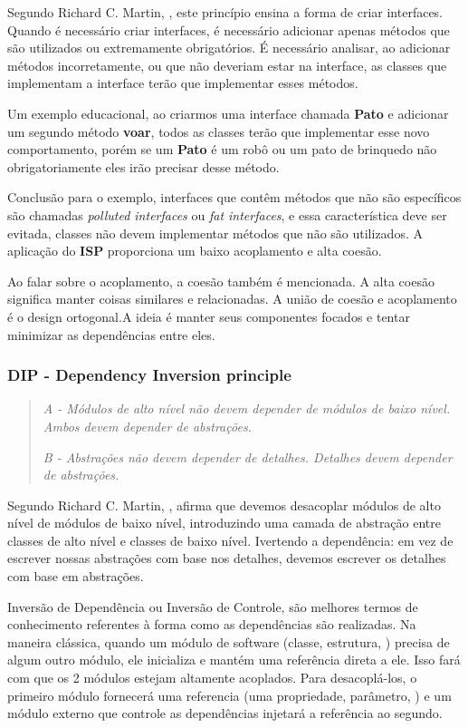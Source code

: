 \documentclass[12pt]{article}
\begin{document}
Segundo Richard C. Martin, \cite{ROBERT_MARTIN_THE_CLEAN_ARCHITECTURE}, este princípio ensina a forma de criar interfaces. Quando é necessário criar interfaces, é necessário adicionar apenas métodos que são utilizados ou extremamente obrigatórios. É necessário analisar, ao adicionar métodos incorretamente, ou que não deveriam estar na interface, as classes que implementam a interface terão que implementar esses métodos. 

Um exemplo educacional, ao criarmos uma interface chamada \textbf{Pato} e adicionar um segundo método \textbf{voar}, todos as classes terão que implementar esse novo comportamento, porém se um \textbf{Pato} é um robô ou um pato de brinquedo não obrigatoriamente eles irão precisar desse método.

Conclusão para o exemplo, interfaces que contêm métodos que não são específicos são chamadas \textit{polluted interfaces} ou \textit{fat interfaces}, e essa característica deve ser evitada, classes não devem implementar métodos que não são utilizados. A aplicação do \textbf{ISP} proporciona um baixo acoplamento e alta coesão.

Ao falar sobre o acoplamento, a coesão também é mencionada. A alta coesão significa manter coisas similares e relacionadas. A união de coesão e acoplamento é o design ortogonal.A ideia é manter seus componentes focados e tentar minimizar as dependências entre eles.

\subsubsection{DIP - Dependency Inversion principle}
\begin{quote}
	\textit{A - Módulos de alto nível não devem depender de módulos de baixo nível. Ambos devem depender de abstrações.}
	
	\textit{B -  Abstrações não devem depender de detalhes. Detalhes devem depender de abstrações.}	
\end{quote}

Segundo Richard C. Martin, \cite{ROBERT_MARTIN_THE_CLEAN_ARCHITECTURE}, afirma que devemos desacoplar módulos de alto nível de módulos de baixo nível, introduzindo uma camada de abstração entre classes de alto nível e classes de baixo nível. Ivertendo a dependência: em vez de escrever nossas abstrações com base nos detalhes, devemos escrever os detalhes com base em abstrações.

Inversão de Dependência ou Inversão de Controle, são melhores termos de conhecimento referentes à forma como as dependências são realizadas. Na maneira clássica, quando um módulo de software (classe, estrutura, ) precisa de algum outro módulo, ele inicializa e mantém uma referência direta a ele. Isso fará com que os 2 módulos estejam altamente acoplados. Para desacoplá-los, o primeiro módulo fornecerá uma referencia (uma propriedade, parâmetro, ) e um módulo externo que controle as dependências injetará a referência ao segundo.
\end{document}

